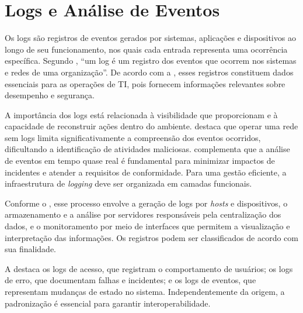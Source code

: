 \documentclass[
    12pt
    ,oneside
    ,a4paper
    ,chapter=TITLE
    ,section=TITLE
    ,sumario=abnt-6027-2012]{abntex2}
\begin{document}
\chapter{Logs e Análise de Eventos}
\label{cap:logs}

Os logs são registros de eventos gerados por sistemas, aplicações e dispositivos ao longo de seu funcionamento, nos quais cada entrada representa uma ocorrência específica. Segundo , “um log é um registro dos eventos que ocorrem nos sistemas e redes de uma organização”. De acordo com a , esses registros constituem dados essenciais para as operações de TI, pois fornecem informações relevantes sobre desempenho e segurança.

A importância dos logs está relacionada à visibilidade que proporcionam e à capacidade de reconstruir ações dentro do ambiente.  destaca que operar uma rede sem logs limita significativamente a compreensão dos eventos ocorridos, dificultando a identificação de atividades maliciosas.  complementa que a análise de eventos em tempo quase real é fundamental para minimizar impactos de incidentes e atender a requisitos de conformidade. Para uma gestão eficiente, a infraestrutura de \textit{logging} deve ser organizada em camadas funcionais.

Conforme o , esse processo envolve a geração de logs por \textit{hosts} e dispositivos, o armazenamento e a análise por servidores responsáveis pela centralização dos dados, e o monitoramento por meio de interfaces que permitem a visualização e interpretação das informações. Os registros podem ser classificados de acordo com sua finalidade.

A  destaca os logs de acesso, que registram o comportamento de usuários; os logs de erro, que documentam falhas e incidentes; e os logs de eventos, que representam mudanças de estado no sistema. Independentemente da origem, a padronização é essencial para garantir interoperabilidade.
\end{document}
